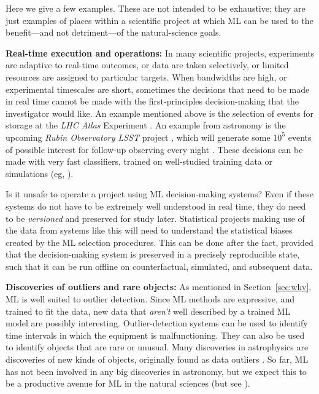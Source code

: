 \documentclass{article}
\renewcommand{\paragraph}[1]{\noindent\par\textbf{#1}}
\newcommand{\sectionname}{Section}
\newcommand{\secref}[1]{\sectionname~\ref{#1}}
\begin{document}
Here we give a few examples.
These are not intended to be exhaustive; they are just examples of places within a scientific project at which ML can be used to the benefit---and not detriment---of the natural-science goals.

\paragraph{Real-time execution and operations:}
In many scientific projects, experiments are adaptive to real-time outcomes, or data are taken selectively, or limited resources are assigned to particular targets.
When bandwidths are high, or experimental timescales are short, sometimes the decisions that need to be made in real time cannot be made with the first-principles decision-making that the investigator would like.
An example mentioned above is the selection of events for storage at the \textsl{LHC Atlas} Experiment \cite{atlas}.
An example from astronomy is the upcoming \textsl{Rubin Observatory LSST} project \cite{rubin}, which will generate some $10^5$ events of possible interest for follow-up observing every night \cite{lsst_events}.
These decisions can be made with very fast classifiers, trained on well-studied training data or simulations (eg, \citealt{lsst_broker}).

Is it unsafe to operate a project using ML decision-making systems?
Even if these systems do not have to be extremely well understood in real time, they do need to be \emph{versioned} and preserved for study later.
Statistical projects making use of the data from systems like this will need to understand the statistical biases created by the ML selection procedures.
This can be done after the fact, provided that the decision-making system is preserved in a precisely reproducible state, such that it can be run offline on counterfactual, simulated, and subsequent data.

\paragraph{Discoveries of outliers and rare objects:}
As mentioned in \secref{sec:why}, ML is well suited to outlier detection.
Since ML methods are expressive, and trained to fit the data, new data that \emph{aren't} well described by a trained ML model are possibly interesting.
Outlier-detection systems can be used to identify time intervals in which the equipment is malfunctioning.
They can also be used to identify objects that are rare or unusual.
Many discoveries in astrophysics are discoveries of new kinds of objects, originally found as data outliers \cite{quasars, voorwerp}.
So far, ML has not been involved in any big discoveries in astronomy, but we expect this to be a productive avenue for ML in the natural sciences (but see \citealt{contardo}).
\end{document}
